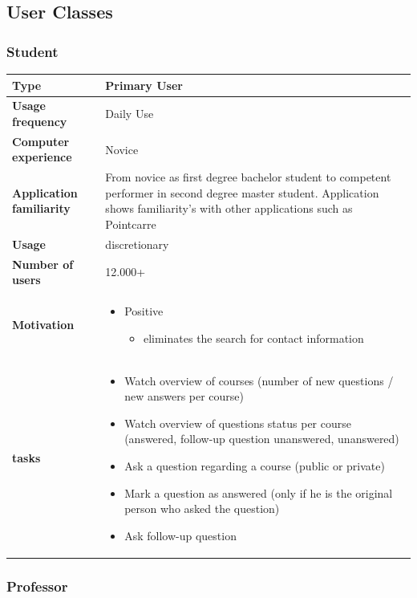 \documentclass[10pt]{report}
\begin{document}
\subsection{User Classes}\label{sec:User_classes}

\subsubsection{Student}

\begin{tabular}{ | l | p{10cm} |}
\hline
\textbf{Type} & Primary User \\ \hline
\textbf{Usage frequency} & Daily Use \\ \hline
\textbf{Computer experience} & Novice \\ \hline
\textbf{Application familiarity} & From novice as first degree bachelor student to competent performer in second degree master student. Application shows familiarity's with other applications such as Pointcarre\\ \hline
\textbf{Usage} & discretionary\\ \hline
\textbf{Number of users} & 12.000+\\ \hline
\textbf{Motivation} & 
	\begin{itemize}
		\item Positive 
		\begin{itemize}
			\item eliminates the search for contact information
		\end{itemize}
	\end{itemize} \\ \hline
\textbf{tasks} & 
	\begin{itemize}
		\item Watch overview of courses (number of new questions / new answers per course)
		\item Watch overview of questions status per course (answered, follow-up question unanswered, unanswered)
		\item Ask a question regarding a course (public or private)
		\item Mark a question as answered (only if he is the original person who asked the question)
		\item Ask follow-up question
	\end{itemize} \\ \hline
\end{tabular}

\subsubsection{Professor}
\end{document}
